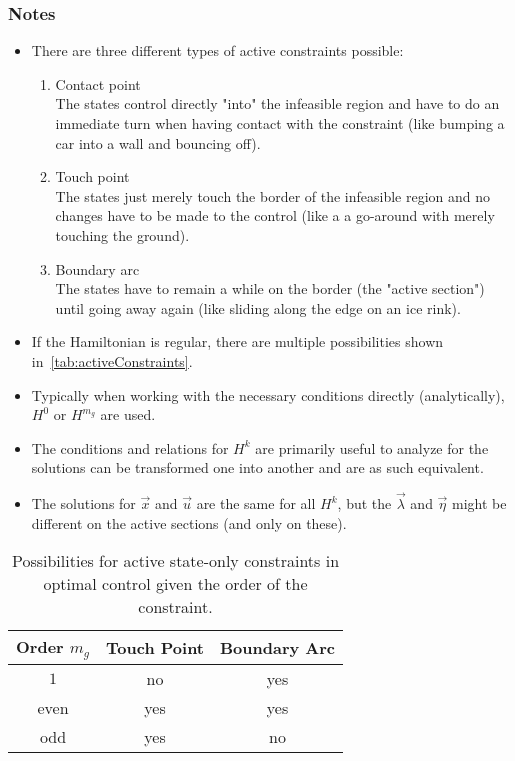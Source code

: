 			\subsubsection{Notes}
				\begin{itemize}
					\item There are three different types of active constraints possible:
						\begin{enumerate}
							\item Contact point \\ The states control directly "into" the infeasible region and have to do an immediate turn when having contact with the constraint (like bumping a car into a wall and bouncing off).
							\item Touch point \\ The states just merely touch the border of the infeasible region and no changes have to be made to the control (like a a go-around with merely touching the ground).
							\item Boundary arc \\ The states have to remain a while on the border (the "active section") until going away again (like sliding along the edge on an ice rink).
						\end{enumerate}
					\item If the Hamiltonian is regular, there are multiple possibilities shown in~\autoref{tab:activeConstraints}.
					\item Typically when working with the necessary conditions directly (analytically), \(H^0\) or \(H^{m_g}\) are used.
					\item The conditions and relations for \(H^k\) are primarily useful to analyze for the solutions can be transformed one into another and are as such equivalent.
					\item The solutions for \(\vec{x}\) and \(\vec{u}\) are the same for all \(H^k\), but the \(\vec{\lambda}\) and \(\vec{\eta}\) might be different on the active sections (and only on these).
				\end{itemize}

				\begin{table}
					\centering
					\begin{tabular}{c|cc}
						Order \(m_g\) & Touch Point & Boundary Arc \\ \hline
						    \(1\)     &     no      &     yes      \\
						    even      &     yes     &     yes      \\
						     odd      &     yes     &      no
					\end{tabular}
					\caption{Possibilities for active state-only constraints in optimal control given the order of the constraint.}
					\label{tab:activeConstraints}
				\end{table}

